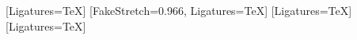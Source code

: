   {\newfontfamily{}[Ligatures=TeX]}
  {\newfontfamily{}[FakeStretch=0.966, Ligatures=TeX]}
\newfontfamily{}[Ligatures=TeX]
\newfontfamily{}
\newfontfamily{}[Ligatures=TeX]
\newfontfamily{}
\setmonofont{Liberation Mono}
\def\pptxbase{apt}
\def\pptxcode{calc}
\def\pptxtitlef{apt}
\def\pptxtitlex{68.18}
\def\pptxtitley{84.75}
\def\pptxtitles{33.8}

